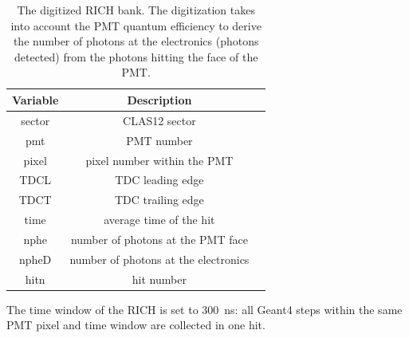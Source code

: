 \begin{table}[h]
	\begin{center}
		\begin{tabular}{| c | c | c |}
			\hline \hline
			Variable & Description                                         \\
			\hline
             sector  &                                     CLAS12 sector   \\
                pmt  &                                        PMT number   \\
              pixel  &                       pixel number within the PMT   \\
               TDCL  &                                  TDC leading edge   \\
               TDCT  &                                 TDC trailing edge   \\
               time  &                           average time of the hit   \\
               nphe  &                 number of photons at the PMT face   \\
               npheD &              number of photons at the electronics   \\
               hitn  &                                        hit number   \\
			\hline \hline
		\end{tabular}
	\end{center}
	\caption{The digitized RICH bank. The digitization takes into account the PMT quantum efficiency
             to derive the number of photons at the electronics (photons detected) from the photons
             hitting the face of the PMT.}\label{tab:richBank}
\end{table}

The time window  of the RICH is set to 300~ns: all Geant4 steps within the same PMT pixel and time window are collected
in one hit.
